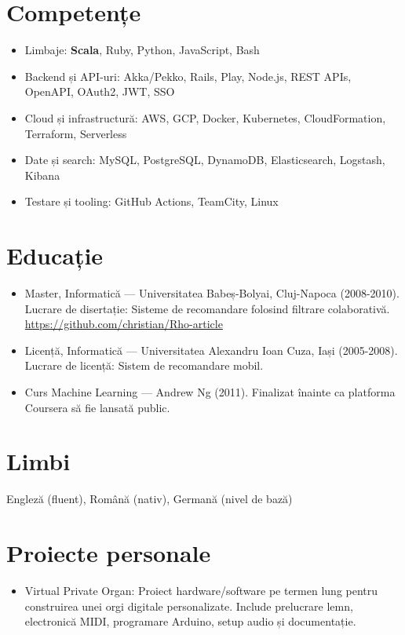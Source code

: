 \documentclass[11pt,a4paper]{article}
\begin{document}
\section*{Competențe}
\begin{itemize}
  \item Limbaje: \textbf{Scala}, Ruby, Python, JavaScript, Bash
  \item Backend și API-uri: Akka/Pekko, Rails, Play, Node.js, REST APIs, OpenAPI, OAuth2, JWT, SSO
  \item Cloud și infrastructură: AWS, GCP, Docker, Kubernetes, CloudFormation, Terraform, Serverless
  \item Date și search: MySQL, PostgreSQL, DynamoDB, Elasticsearch, Logstash, Kibana
  \item Testare și tooling: GitHub Actions, TeamCity, Linux
\end{itemize}

\section*{Educație}
\begin{itemize}
  \item Master, Informatică --- Universitatea Babeș-Bolyai, Cluj-Napoca (2008-2010). Lucrare de disertație: Sisteme de recomandare folosind filtrare colaborativă. \href{https://github.com/christian/Rho-article}{https://github.com/christian/Rho-article}
  \item Licență, Informatică --- Universitatea Alexandru Ioan Cuza, Iași (2005-2008). Lucrare de licență: Sistem de recomandare mobil.
  \item Curs Machine Learning --- Andrew Ng (2011). Finalizat înainte ca platforma Coursera să fie lansată public.
\end{itemize}

\section*{Limbi}
Engleză (fluent), Română (nativ), Germană (nivel de bază)

\section*{Proiecte personale}
\begin{itemize}
  \item Virtual Private Organ: Proiect hardware/software pe termen lung pentru construirea unei orgi digitale personalizate. Include prelucrare lemn, electronică MIDI, programare Arduino, setup audio și documentație.
\end{itemize}
\end{document}
